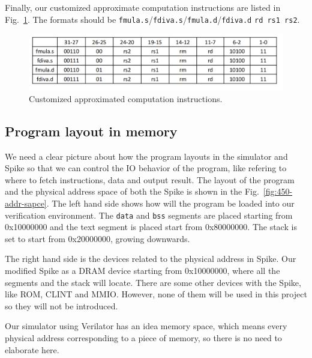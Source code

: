 Finally, our customized approximate computation instructions are listed in Fig.~\ref{fig:customized approximated computation instructions}. The formats should be \texttt{fmula.s}/\texttt{fdiva.s}/\texttt{fmula.d}/\texttt{fdiva.d} \texttt{rd rs1 rs2}. 
\begin{figure}[!htp]
    \centering
    \includegraphics[width=0.8\linewidth]{figure/instruction.png}
    \caption{Customized approximated computation instructions.}
    \label{fig:customized approximated computation instructions}
\end{figure}

\subsection{Program layout in memory} %
We need a clear picture about how the program layouts in the simulator and Spike so that we can control the IO behavior of the program, like refering to where to fetch instructions, data and output result. The layout of the program and the physical address space of both the Spike is shown in the Fig.~\ref{fig:450-addr-sapce}. The left hand side shows how will the program be loaded into our verification environment. The \texttt{data} and \texttt{bss} segments are placed starting from 0x10000000 and the text segment is placed start from 0x80000000. The stack is set to start from 0x20000000, growing downwards. 

The right hand side is the devices related to the physical address in Spike. Our modified Spike as a DRAM device starting from 0x10000000, where all the segments and the stack will locate. There are some other devices with the Spike, like ROM, CLINT and MMIO. However, none of them will be used in this project so they will not be introduced. 

Our simulator using Verilator has an idea memory space, which means every physical address corresponding to a piece of memory, so there is no need to elaborate here. 

